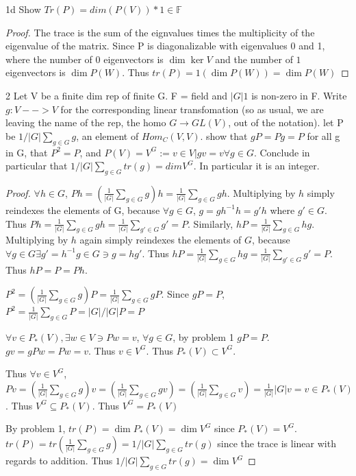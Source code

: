 \documentclass{article}
\newcommand{\F}{\mathbb{F}}
\begin{document}
\begin{claim}{1d}\label{Claim 1d.}
    Show $Tr(P) = dim(P(V)) * 1 \in \F$ 
\end{claim}
\begin{proof}
    The trace is the sum of the eignvalues times the multiplicity of the eigenvalue of the matrix. Since P is diagonalizable with eigenvalues 0 and 1, where the number of $0$ eigenvectors is $\dim \ker V$ and the number of $1$ eigenvectors is $\dim P(W)$. Thus $tr(P) = 1(\dim P(W)) = \dim P(W)$    
\end{proof}

\bigskip

\begin{PROB}{2}\label{Problem 2.}
    Let V be a finite dim rep of finite G. F = field and $|G|1$ is non-zero in F.  Write $g: V --> V$ for the corresponding linear transfomation (so as usual, we are leaving the name of the rep, the homo $G \to GL(V)$, out of the notation). let P be  $1/|G| \sum_{g \in G} g$, an element of $Hom_C(V,V)$.  show that $gP = Pg = P$ for all g in G, that $P^2 = P$, and  $P(V) = V^G :={v \in V| gv = v \forall g \in G}$.  Conclude in particular that $1/|G| \sum_{g \in G} tr(g) = dim V^G$.  In particular it is an integer.
\end{PROB}
\begin{proof}
    $\forall h \in G$, $Ph = (\frac{1}{|G|} \sum_{g \in G} g) h = \frac{1}{|G|} \sum_{g \in G} gh$. Multiplying by $h$ simply reindexes the elements of G, because $\forall g \in G$, $g = gh^{-1}h = g'h$ where $g' \in G$. Thus $Ph = \frac{1}{|G|} \sum_{g \in G} gh = \frac{1}{|G|} \sum_{g' \in G} g' = P$. Similarly, $hP = \frac{1}{|G|} \sum_{g \in G} hg$. Multiplying by $h$ again simply reindexes the elements of $G$, because $\forall g \in G \exists g' = h^{-1}g \in G \ni g = hg'$. Thus $hP = \frac{1}{|G|} \sum_{g \in G} hg = \frac{1}{|G|} \sum_{g' \in G} g' = P$. Thus $hP = P = Ph$. 
    
    
    $P^2 = (\frac{1}{|G|} \sum_{g \in G} g)P = \frac{1}{|G|}\sum_{g \in G} gP$. Since $gP = P$, $P^2 = \frac{1}{|G|} \sum_{g \in G} P = |G|/|G| P = P$


    $\forall v \in P_*(V), \exists w \in V \ni Pw = v$, $\forall g \in G $, by problem 1 $gP = P$. $gv = gPw = Pw = v$. Thus $v \in V^G$. Thus $P_*(V) \subset V^G$. 
    
    Thus $\forall v \in V^G$, $Pv = (\frac{1}{|G|} \sum_{g \in G} g)v = (\frac{1}{|G|} \sum_{g \in G} gv) = (\frac{1}{|G|} \sum_{g \in G} v) = \frac{1}{|G|}|G| v = v \in P_*(V)$. Thus $V^G \subseteq P_*(V)$. Thus $V^G = P_*(V)$

    By problem 1, $tr(P) = \dim P_*(V) = \dim V^G$ since $P_*(V) = V^G$. $tr(P) = tr(\frac{1}{|G|} \sum_{g \in G} g) = 1/|G| \sum_{g \in G} tr(g)$ since the trace is linear with regards to addition. Thus $1/|G| \sum_{g \in G} tr(g) = \dim V^G$   
\end{proof}
\end{document}
